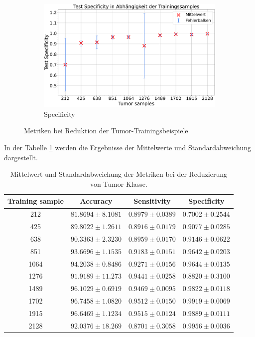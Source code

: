 \begin{figure}[H]
\begin{subfigure}[b]{0.48\textwidth}
    \label{fig:reduzierung_tu_sensitivity}
  \end{subfigure}
  \begin{subfigure}[b]{0.48\textwidth}
    \includegraphics[width=\textwidth]{plots/neu Reduzierung-Tu + Balance_Specificity_mean.pdf}
    \caption{Specificity}
    \label{fig:reduzierung_tu_specificity}
  \end{subfigure}
  \caption{Metriken bei Reduktion der Tumor-Trainingsbeispiele}
  \label{fig:reduzierung_tumorsamples}
\end{figure}
In der Tabelle \ref{tab:red_tu} werden die Ergebnisse der Mittelwerte und Standardabweichung dargestellt.
\begin{table}[H]
    \centering
        \begin{tabular}{cccc}
            \toprule
            Training sample & Accuracy & Sensitivity & Specificity\\
            \midrule
            212  & $81.8694 \pm 8.1081$ & $0.8979 \pm 0.0389$ & $0.7002 \pm 0.2544$\\
            425  & $89.8022 \pm 1.2611$ & $0.8916 \pm 0.0179$ & $0.9077 \pm 0.0285$\\
            638  & $90.3363 \pm 2.3230$ & $0.8959 \pm 0.0170$ & $0.9146 \pm 0.0622$\\
            851  & $93.6696 \pm 1.1535$ & $0.9183 \pm 0.0151$ & $0.9642 \pm 0.0203$\\
            1064 & $94.2038 \pm 0.8486$ & $0.9271 \pm 0.0156$ & $0.9644 \pm 0.0135$\\
            1276 & $91.9189 \pm 11.273$ & $0.9441 \pm 0.0258$ & $0.8820 \pm 0.3100$\\
            1489 & $96.1029 \pm 0.6919$ & $0.9469 \pm 0.0095$ & $0.9822 \pm 0.0118$\\
            1702 & $96.7458 \pm 1.0820$ & $0.9512 \pm 0.0150$ & $0.9919 \pm 0.0069$\\
            1915 & $96.6469 \pm 1.1234$ & $0.9515 \pm 0.0124$ & $0.9889 \pm 0.0111$\\
            2128 & $92.0376 \pm 18.269$ & $0.8701 \pm 0.3058$ & $0.9956 \pm 0.0036$\\
            \bottomrule
        \end{tabular}
  \caption{Mittelwert und Standardabweichung der Metriken bei der Reduzierung von Tumor Klasse.}
  \label{tab:red_tu}
\end{table}

